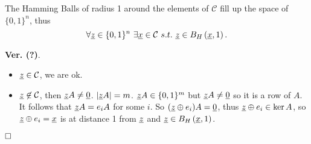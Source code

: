 \begin{obs}
	The Hamming Balls of radius 1 around the elements of $\mathcal{C}$ fill up the space of $\{0, 1\}^n$, thus $$\forall \str{z} \in \{0, 1\}^n\ \exists \str{x} \in \mathcal{C}\ s.t.\ \str{z} \in \hball{x}{1}.$$
\end{obs}

\noindent\textbf{Ver. (?)}.
\begin{itemize}
	\item $\underline{z} \in \mathcal{C}$, we are ok. 
	\item $\underline{z} \not\in \mathcal{C}$, then $\underline{z}A \not= \underline{0}$. $|\underline{z}A| = m$. $\underline{z}A \in \{0, 1\}^m$ but $\underline{z}A \not= \underline{0}$ so it is a row of $A$. It follows that $\underline{z}A = e_iA$ for some $i$. So $(\underline{z} \oplus e_i)A = \underline{0}$, thus $\underline{z}\oplus e_i \in \ker A$, so $\underline{z}\oplus e_i = \underline{x}$ is at distance 1 from $\underline{z}$ and $\underline{z} \in B_H\left(\underline{x}, 1\right)$.
\end{itemize}
$\hfill\Box$
